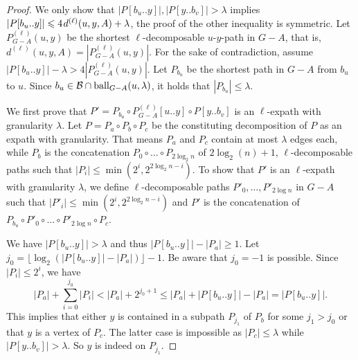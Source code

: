 \documentclass{article}\usepackage[a4paper,margin=20mm]{geometry}
\newcommand*{\B}{\mathcal{B}}
\newcommand*{\length}[1]{|#1|}
\newcommand*{\ball}{\mbox{\rm ball}}
\newcommand*{\nwspace}{\hspace*{.1em}}
\renewcommand{\leq}{\leqslant}
\renewcommand{\le}{\leqslant}
\renewcommand{\ge}{\geqslant}
\begin{document}
\begin{proof}
We only show that $|P[b_u..y]|, \length{P[y..b_v]} > \lambda$ implies 
$\length{P[b_u..y]} \le 4 \nwspace d^{(\ell)}(u,y,A) + \lambda$,
the proof of the other inequality is symmetric.
Let $P^{(\ell)}_{G-A}(u,y)$ be the shortest $\ell$-decomposable $u$-$y$-path
in $G-A$, that is, $d^{(\ell)}(u,y,A) = \length{P^{(\ell)}_{G-A}(u,y)}$.
For the sake of contradiction, assume $\length{P[b_u..y]}-\lambda > 4\length{P^{(\ell)}_{G-A}(u,y)}$.
Let $P_{b_u}$ be the shortest path in $G-A$ from $b_u$ to $u$.
Since $b_u \in \B \cap \ball_{G-A}(u,\lambda)$, it holds that $\length{P_{b_u}} \leq \lambda$.

We first prove that $P'=P_{b_u} \circ P^{(\ell)}_{G-A}[u..y]\circ P[y..b_v]$ is an $\ell$-expath with granularity $\lambda$.
Let $P=P_a \circ P_b \circ P_c$ be the constituting decomposition of $P$ as an expath with granularity.
That means $P_a$ and $P_c$ contain at most $\lambda$ edges each, while $P_b$ is the concatenation $P_0\circ \ldots \circ P_{2\log_2 n}$ of $2\log_2(n)+1$, $\ell$-decomposable paths 
such that $\length{P_i} \leq \min(2^i,2^{2\log_2 n - i})$.
To show that $P'$ is an $\ell$-expath with granularity $\lambda$, we define $\ell$-decomposable paths $P'_0,\ldots, P'_{2\log n}$ in $G-A$ such that $\length{P'_i} \leq \min(2^i,2^{2\log_2 n - i})$ and $P'$ is the concatenation of $P_{b_u} \circ P'_0 \circ \ldots \circ P'_{2\log n} \circ P_c$.

We have $\length{P[b_u..y]} > \lambda$ and thus $\length{P[b_u..y]}-\length{P_a} \ge 1$.
Let $j_0= \lfloor \log_2(\length{P[b_u..y]}-\length{P_a})\rfloor -1$.
Be aware that $j_0  = -1$ is possible.
Since $\length{P_i} \leq 2^i$, we have
\begin{equation*}
	\length{P_a} + \sum_{i=0}^{j_0} \length{P_i} < \length{P_a} + 2^{j_0+1} \le
	\length{P_a} + \length{P[b_u..y]}-\length{P_a}
	= \length{P[b_u..y]}.
\end{equation*}
This implies that either $y$ is contained in a subpath $P_{j_1}$ of $P_b$ for some $j_1 > j_0$ 
or that $y$ is a vertex of $P_c$. 
The latter case is impossible 
as $\length{P_c} \leq \lambda$ while $\length{P[y..b_v]} > \lambda$. 
So $y$ is indeed on $P_{j_1}$.


\end{proof}
\end{document}
